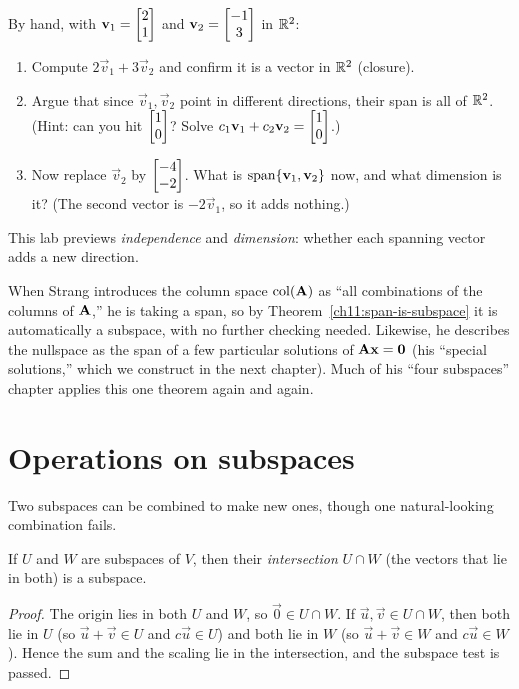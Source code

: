 \begin{labbox}
By hand, with $\mathbf{v}_1=\begin{bmatrix}2\\1\end{bmatrix}$ and $\mathbf{v}_2=\begin{bmatrix}-1\\3\end{bmatrix}$ in $\mathbb{R}^2$:
\begin{enumerate}
  \item Compute $2\vec{v}_1 + 3\vec{v}_2$ and confirm it is a vector in $\mathbb{R}^2$ (closure).
  \item Argue that since $\vec{v}_1,\vec{v}_2$ point in different directions, their span is
  all of $\mathbb{R}^2$. (Hint: can you hit $\begin{bmatrix}1\\0\end{bmatrix}$? Solve
  $c_1\mathbf{v}_1+c_2\mathbf{v}_2=\begin{bmatrix}1\\0\end{bmatrix}$.)
  \item Now replace $\vec{v}_2$ by $\begin{bmatrix}-4\\-2\end{bmatrix}$. What is $\operatorname{span}\{\mathbf{v}_1,\mathbf{v}_2\}$
  now, and what dimension is it? (The second vector is $-2\vec{v}_1$, so it adds nothing.)
\end{enumerate}
This lab previews \emph{independence} and \emph{dimension}: whether each
spanning vector adds a new direction.
\end{labbox}

\begin{strangbox}
When Strang introduces the column space $\operatorname{col}(\mathbf{A})$ as ``all combinations of the
columns of $\mathbf{A}$,'' he is taking a span, so by Theorem~\ref{ch11:span-is-subspace}
it is automatically a subspace, with no further checking needed. Likewise, he describes the
nullspace as the span of a few particular solutions of $\mathbf{A}\mathbf{x}=\mathbf{0}$ (his
``special solutions,'' which we construct in the next chapter). Much of his ``four
subspaces'' chapter applies this one theorem again and again.
\end{strangbox}

\section{Operations on subspaces}

Two subspaces can be combined to make new ones, though one natural-looking combination
fails.

\begin{proposition}\label{ch11:intersection}
If $U$ and $W$ are subspaces of $V$, then their \emph{intersection} $U\cap W$ (the vectors
that lie in both) is a subspace.
\end{proposition}

\begin{proof}
The origin lies in both $U$ and $W$, so $\vec{0}\in U\cap W$. If
$\vec{u},\vec{v}\in U\cap W$, then both lie in $U$ (so $\vec{u}+\vec{v}\in U$ and
$c\vec{u}\in U$) and both lie in $W$ (so $\vec{u}+\vec{v}\in W$ and $c\vec{u}\in W$). Hence
the sum and the scaling lie in the intersection, and the subspace test is passed.
\end{proof}

